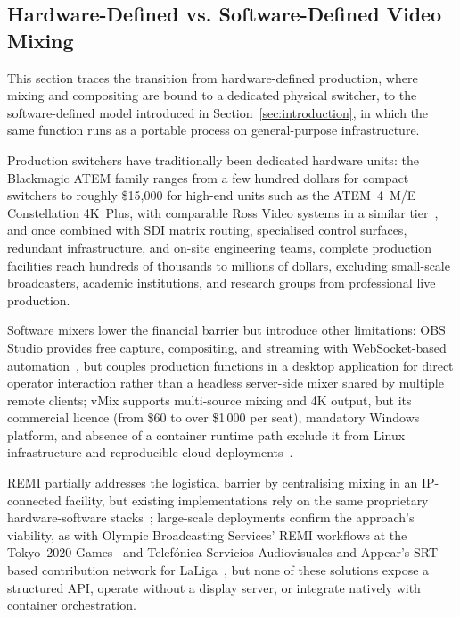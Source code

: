\documentclass[electronics,article,submit,pdftex,moreauthors]{Definitions/mdpi}
\begin{document}
\subsection{Hardware-Defined vs. Software-Defined Video Mixing}
\label{sec:background:production}

This section traces the transition from hardware-defined production, where mixing and compositing are bound to a dedicated physical switcher, to the software-defined model introduced in Section~\ref{sec:introduction}, in which the same function runs as a portable process on general-purpose infrastructure.

Production switchers have traditionally been dedicated hardware units: the Blackmagic ATEM family ranges from a few hundred dollars for compact switchers to roughly \$15{,}000 for high-end units such as the ATEM~4~M/E Constellation 4K~Plus, with comparable Ross Video systems in a similar tier~\cite{blackmagic_atem}, and once combined with SDI matrix routing, specialised control surfaces, redundant infrastructure, and on-site engineering teams, complete production facilities reach hundreds of thousands to millions of dollars, excluding small-scale broadcasters, academic institutions, and research groups from professional live production.

Software mixers lower the financial barrier but introduce other limitations: OBS Studio provides free capture, compositing, and streaming with WebSocket-based automation~\cite{obs_studio,obs_websocket}, but couples production functions in a desktop application for direct operator interaction rather than a headless server-side mixer shared by multiple remote clients; vMix supports multi-source mixing and 4K output, but its commercial licence (from \$60 to over \$1\,000 per seat), mandatory Windows platform, and absence of a container runtime path exclude it from Linux infrastructure and reproducible cloud deployments~\cite{vmix_software}. 

REMI partially addresses the logistical barrier by centralising mixing in an IP-connected facility, but existing implementations rely on the same proprietary hardware-software stacks~\cite{tmbroadcast_remi}; large-scale deployments confirm the approach's viability, as with Olympic Broadcasting Services' REMI workflows at the Tokyo~2020 Games~\cite{obs_tokyo_2021} and Telef\'onica Servicios Audiovisuales and Appear's SRT-based contribution network for LaLiga~\cite{tsa_laliga_srt_2025}, but none of these solutions expose a structured API, operate without a display server, or integrate natively with container orchestration.
\end{document}
